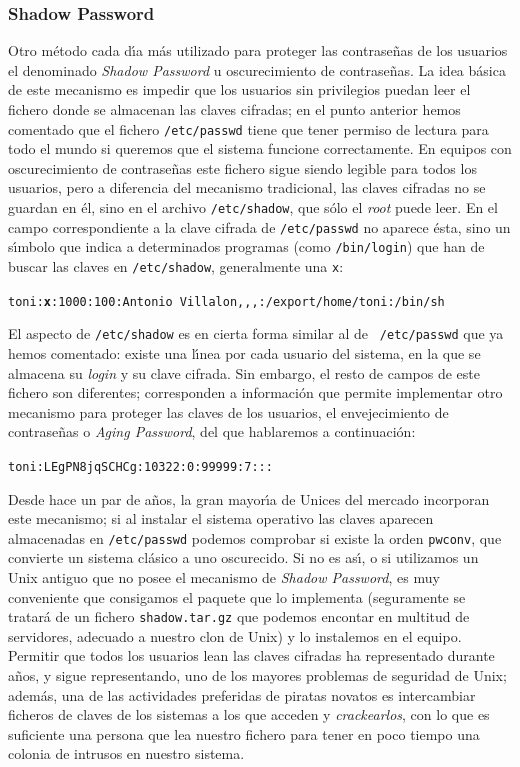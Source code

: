 \subsubsection{Shadow Password}
Otro m\'etodo cada d\'{\i}a m\'as utilizado para proteger las contrase\~nas
de los usuarios el denominado {\it Shadow Password} u oscurecimiento de
contrase\~nas. La idea b\'asica de 
este mecanismo es impedir que los usuarios sin privilegios puedan leer el 
fichero donde se almacenan las claves cifradas; en el punto anterior hemos
comentado que el fichero {\tt /etc/passwd} tiene que tener permiso de lectura
para todo el mundo si queremos que el sistema funcione correctamente. En 
equipos con oscurecimiento de contrase\~nas este fichero sigue siendo legible
para todos los usuarios, pero a diferencia del mecanismo tradicional, las 
claves cifradas no se guardan en \'el, sino en el archivo {\tt /etc/shadow},
que s\'olo el {\it root} puede leer. En el campo correspondiente a la clave
cifrada de {\tt /etc/passwd} no aparece \'esta, sino un s\'{\i}mbolo que indica
a determinados programas (como {\tt /bin/login}) que han de buscar las claves 
en {\tt /etc/shadow}, generalmente una {\tt x}:
\begin{center}
{\tt toni:{\bf x}:1000:100:Antonio Villalon,,,:/export/home/toni:/bin/sh}\vspace{5pt}\\
\end{center}
El aspecto de {\tt /etc/shadow} es en cierta forma similar al de {\tt 
/etc/passwd} que ya hemos comentado: existe una l\'{\i}nea por cada usuario del
sistema, en la que se almacena su {\it login} y su clave cifrada. Sin embargo, 
el resto de campos de este fichero son diferentes; corresponden a informaci\'on 
que permite implementar otro mecanismo para proteger las claves de los usuarios,
el envejecimiento de contrase\~nas o {\it Aging Password}, del que hablaremos a
continuaci\'on:
\begin{center}
{\tt toni:LEgPN8jqSCHCg:10322:0:99999:7:::}
\end{center}
Desde hace un par de a\~nos, la gran mayor\'{\i}a de Unices del mercado 
incorporan este mecanismo; si al instalar el sistema operativo las claves 
aparecen almacenadas en {\tt /etc/passwd} podemos comprobar si existe la orden
{\tt pwconv}, que convierte un sistema cl\'asico a uno oscurecido. Si no es
as\'{\i}, o si utilizamos un Unix antiguo que no posee el mecanismo de {\it
Shadow Password}, es muy conveniente que consigamos el paquete que lo 
implementa (seguramente se tratar\'a de un fichero {\tt shadow.tar.gz} que
podemos encontar en multitud de servidores, adecuado a nuestro clon de Unix) y
lo instalemos en el equipo. Permitir que todos los usuarios lean las 
claves cifradas ha representado durante a\~nos, y sigue representando, uno de 
los mayores problemas de seguridad de Unix; adem\'as, una de las actividades
preferidas de piratas novatos es intercambiar ficheros de claves de los sistemas
a los que acceden y {\it crackearlos}, con lo que es suficiente una persona que
lea nuestro fichero para tener en poco tiempo una colonia de intrusos en 
nuestro sistema. 
